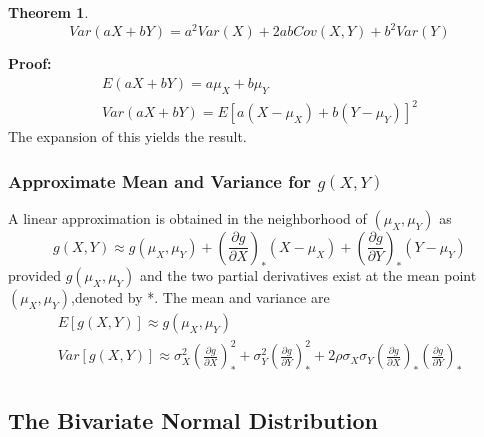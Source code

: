 \documentclass{article}
\newtheorem{theorem}{Theorem}[section]
\begin{document}
\begin{theorem}
    \begin{equation*}
        Var(aX+bY)=a^2Var(X)+2ab Cov(X,Y) + b^2 Var(Y)
    \end{equation*}
\end{theorem}
\textbf{Proof:} 
\begin{equation*}
    \begin{split}
        E(aX+bY)=a \mu_X + b \mu_Y\\
        Var(aX+bY)=E[a(X-\mu_X)+b(Y-\mu_Y)]^2
    \end{split}
\end{equation*}
The expansion of this yields the result.

\subsubsection{Approximate Mean and Variance for \(g(X,Y)\)}

A linear approximation is obtained in the neighborhood of \((\mu_X,\mu_Y)\) as
\begin{equation*}
 g(X, Y) \approx g(\mu_X, \mu_Y) + \left( \frac{\partial g}{\partial X} \right)_* (X - \mu_X) + \left( \frac{\partial g}{\partial Y} \right)_* (Y - \mu_Y)
\end{equation*}
provided \(g(\mu_X,\mu_Y)\) and the two partial derivatives exist at the mean point \((\mu_X,\mu_Y)\),denoted by *. The mean and variance are
\begin{equation*}
    \begin{split}
        E[g(X,Y)] \approx g(\mu_X,\mu_Y)\\
        Var[g(X,Y)] \approx \sigma_X^2 \left( \frac{\partial g}{\partial X} \right)_* ^2 + \sigma_Y^2 \left( \frac{\partial g}{\partial Y} \right)_* ^2 + 2 \rho \sigma_X \sigma_Y \left( \frac{\partial g}{\partial X} \right)_* \left( \frac{\partial g}{\partial Y} \right)_*
    \end{split}
\end{equation*}

\subsection{The Bivariate Normal Distribution}
\end{document}
